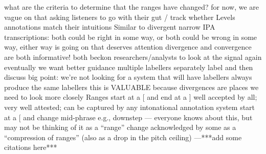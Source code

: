\markdownRendererUlEndTight \markdownRendererUlItemEnd 
\markdownRendererUlItem what are the criteria to determine that the ranges have changed?\markdownRendererInterblockSeparator
{}\markdownRendererUlBeginTight
\markdownRendererUlItem for now, we are vague on that\markdownRendererInterblockSeparator
{}\markdownRendererUlBeginTight
\markdownRendererUlItem asking listeners to go with their gut / track whether Levels annotations match their intuitions\markdownRendererUlItemEnd 
\markdownRendererUlItem Similar to divergent narrow IPA transcriptions: both could be right in some way, or both could be wrong in some way, either way  is going on that deserves attention\markdownRendererUlItemEnd 
\markdownRendererUlItem divergence and convergence are both informative! both beckon researchers/analysts to look at the signal again\markdownRendererUlItemEnd 
\markdownRendererUlEndTight \markdownRendererUlItemEnd 
\markdownRendererUlItem eventually we want better guidance\markdownRendererInterblockSeparator
{}\markdownRendererUlBeginTight
\markdownRendererUlItem multiple labellers separately label and then discuss\markdownRendererUlItemEnd 
\markdownRendererUlEndTight \markdownRendererUlItemEnd 
\markdownRendererUlEndTight \markdownRendererUlItemEnd 
\markdownRendererUlItem big point:\markdownRendererInterblockSeparator
{}\markdownRendererUlBeginTight
\markdownRendererUlItem we're not looking for a system that will have labellers always produce the same labellers\markdownRendererUlItemEnd 
\markdownRendererUlItem this is VALUABLE because divergences are places we need to look more closely\markdownRendererUlItemEnd 
\markdownRendererUlEndTight \markdownRendererUlItemEnd 
\markdownRendererUlItem Ranges\markdownRendererInterblockSeparator
{}\markdownRendererUlBeginTight
\markdownRendererUlItem start at a [ and end at a ]\markdownRendererInterblockSeparator
{}\markdownRendererUlBeginTight
\markdownRendererUlItem well accepted by all; very well attested; can be captured by any intonational annotation system\markdownRendererUlItemEnd 
\markdownRendererUlEndTight \markdownRendererUlItemEnd 
\markdownRendererUlItem start at a [ and change mid-phrase\markdownRendererInterblockSeparator
{}\markdownRendererUlBeginTight
\markdownRendererUlItem e.g., downstep — everyone knows about this, but may not be thinking of it as a “range” change\markdownRendererUlItemEnd 
\markdownRendererUlItem acknowledged by some as a “compression of ranges” (also as a drop in the pitch ceiling) —***\markdownRendererNbsp{}add some citations here***\markdownRendererUlItemEnd 
